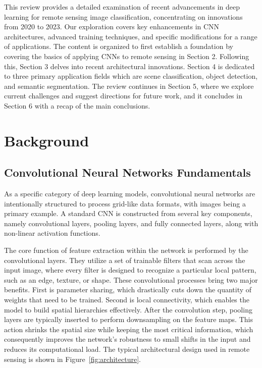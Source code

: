 \documentclass[12pt,a4paper]{article}
\begin{document}
This review provides a detailed examination of recent advancements in deep learning for remote sensing image classification, concentrating on innovations from 2020 to 2023. Our exploration covers key enhancements in CNN architectures, advanced training techniques, and specific modifications for a range of applications. The content is organized to first establish a foundation by covering the basics of applying CNNs to remote sensing in Section 2. Following this, Section 3 delves into recent architectural innovations. Section 4 is dedicated to three primary application fields which are scene classification, object detection, and semantic segmentation. The review continues in Section 5, where we explore current challenges and suggest directions for future work, and it concludes in Section 6 with a recap of the main conclusions.

\section{Background}
\label{sec:background}

\subsection{Convolutional Neural Networks Fundamentals}
As a specific category of deep learning models, convolutional neural networks are intentionally structured to process grid-like data formats, with images being a primary example. A standard CNN is constructed from several key components, namely convolutional layers, pooling layers, and fully connected layers, along with non-linear activation functions.

The core function of feature extraction within the network is performed by the convolutional layers. They utilize a set of trainable filters that scan across the input image, where every filter is designed to recognize a particular local pattern, such as an edge, texture, or shape. These convolutional processes bring two major benefits. First is parameter sharing, which drastically cuts down the quantity of weights that need to be trained. Second is local connectivity, which enables the model to build spatial hierarchies effectively. After the convolution step, pooling layers are typically inserted to perform downsampling on the feature maps. This action shrinks the spatial size while keeping the most critical information, which consequently improves the network's robustness to small shifts in the input and reduces its computational load. The typical architectural design used in remote sensing is shown in Figure~\ref{fig:architecture}.
\end{document}
